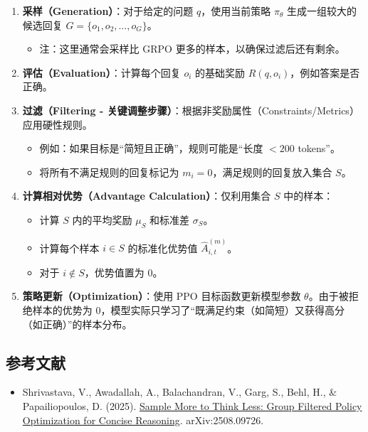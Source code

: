 \begin{enumerate}
\def\labelenumi{\arabic{enumi}.}
\tightlist
\item
  \textbf{采样（Generation）}：对于给定的问题 \(q\)，使用当前策略 \(\pi_\theta\) 生成一组较大的候选回复 \(G=\{o_1,o_2,\ldots,o_G\}\)。

  \begin{itemize}
  \tightlist
  \item
    注：这里通常会采样比 GRPO 更多的样本，以确保过滤后还有剩余。
  \end{itemize}
\item
  \textbf{评估（Evaluation）}：计算每个回复 \(o_i\) 的基础奖励 \(R(q,o_i)\)，例如答案是否正确。
\item
  \textbf{过滤（Filtering - 关键调整步骤）}：根据非奖励属性（Constraints/Metrics）应用硬性规则。

  \begin{itemize}
  \tightlist
  \item
    例如：如果目标是``简短且正确''，规则可能是``长度 \(<200\) tokens''。
  \item
    将所有不满足规则的回复标记为 \(m_i=0\)，满足规则的回复放入集合 \(S\)。
  \end{itemize}
\item
{}
  \textbf{计算相对优势（Advantage Calculation）}：仅利用集合 \(S\) 中的样本：

  \begin{itemize}
  \tightlist
  \item
    计算 \(S\) 内的平均奖励 \(\mu_S\) 和标准差 \(\sigma_S\)。
  \item
    计算每个样本 \(i \in S\) 的标准化优势值 \(\hat{A}_{i,t}^{(m)}\)。
  \item
    对于 \(i \notin S\)，优势值置为 \(0\)。
  \end{itemize}
\item
  \textbf{策略更新（Optimization）}：使用 PPO 目标函数更新模型参数 \(\theta\)。由于被拒绝样本的优势为 \(0\)，模型实际只学习了``既满足约束（如简短）又获得高分（如正确）''的样本分布。
\end{enumerate}

\FloatBarrier
{}
\hypertarget{ux53c2ux8003ux6587ux732e-112}{%
\subsection{参考文献}\label{ux53c2ux8003ux6587ux732e-112}}

\vspace{0.25em}
\begin{itemize}
\tightlist
\item
  Shrivastava, V., Awadallah, A., Balachandran, V., Garg, S., Behl, H., \& Papailiopoulos, D. (2025). \href{https://arxiv.org/abs/2508.09726}{Sample More to Think Less: Group Filtered Policy Optimization for Concise Reasoning}. arXiv:2508.09726.
\end{itemize}

\clearpage
